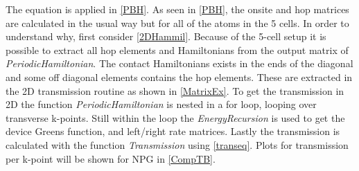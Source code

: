 The equation is applied in \cref{PBH}.
\vspace{-.5\baselineskip}
\vspace{\baselineskip}
As seen in \cref{PBH}, the onsite and hop matrices are calculated in the usual way but for all of the atoms in the 5 cells. In order to understand why, first consider \cref{2DHammil}.
Because of the 5-cell setup it is possible to extract all hop elements and Hamiltonians from the output matrix of \textit{PeriodicHamiltonian}. The contact Hamiltonians exists in the ends of the diagonal and some off diagonal elements contains the hop elements. These are extracted in the 2D transmission routine as shown in \cref{MatrixEx}.
\vspace{-.5\baselineskip}
\vspace{\baselineskip}
To get the transmission in 2D the function \textit{PeriodicHamiltonian} is nested in a for loop, looping over transverse k-points. Still within the loop the \textit{EnergyRecursion} is used to get the device Greens function, and left/right rate matrices. Lastly the transmission is calculated with the function \textit{Transmission} using \cref{transeq}.
Plots for transmission per k-point will be shown for NPG in \cref{CompTB}.
